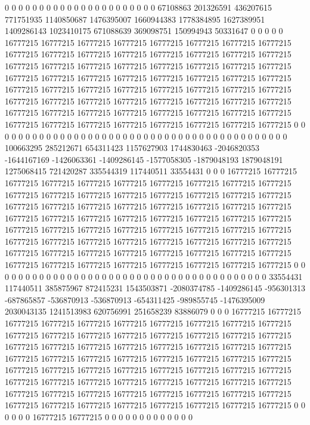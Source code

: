 0 0 0 0 0 0 0 0 0 0 0 0 0 0 0 0 0 0 0 0 0 0 67108863 201326591 436207615 771751935 1140850687 1476395007 1660944383 1778384895 1627389951 1409286143 1023410175 671088639 369098751 150994943 50331647 0 0 0 0 0 16777215 16777215 16777215 16777215 16777215 16777215 16777215 16777215 16777215 16777215 16777215 16777215 16777215 16777215 16777215 16777215 16777215 16777215 16777215 16777215 16777215 16777215 16777215 16777215 16777215 16777215 16777215 16777215 16777215 16777215 16777215 16777215 16777215 16777215 16777215 16777215 16777215 16777215 16777215 16777215 16777215 16777215 16777215 16777215 16777215 16777215 16777215 16777215 16777215 16777215 16777215 16777215 16777215 16777215 16777215 16777215 16777215 16777215 16777215 16777215 16777215 16777215 16777215 16777215 0 0 0 0 0 0 0 0 0 0 0 0 0 0 0 0 0 0 0 0 0 0
0 0 0 0 0 0 0 0 0 0 0 0 0 0 0 0 0 0 0 0 0 100663295 285212671 654311423 1157627903 1744830463 -2046820353 -1644167169 -1426063361 -1409286145 -1577058305 -1879048193 1879048191 1275068415 721420287 335544319 117440511 33554431 0 0 0 16777215 16777215 16777215 16777215 16777215 16777215 16777215 16777215 16777215 16777215 16777215 16777215 16777215 16777215 16777215 16777215 16777215 16777215 16777215 16777215 16777215 16777215 16777215 16777215 16777215 16777215 16777215 16777215 16777215 16777215 16777215 16777215 16777215 16777215 16777215 16777215 16777215 16777215 16777215 16777215 16777215 16777215 16777215 16777215 16777215 16777215 16777215 16777215 16777215 16777215 16777215 16777215 16777215 16777215 16777215 16777215 16777215 16777215 16777215 16777215 16777215 16777215 16777215 16777215 16777215 16777215 0 0 0 0 0 0 0 0 0 0 0 0 0 0 0 0 0 0 0 0 0
0 0 0 0 0 0 0 0 0 0 0 0 0 0 0 0 0 0 0 33554431 117440511 385875967 872415231 1543503871 -2080374785 -1409286145 -956301313 -687865857 -536870913 -536870913 -654311425 -989855745 -1476395009 2030043135 1241513983 620756991 251658239 83886079 0 0 0 16777215 16777215 16777215 16777215 16777215 16777215 16777215 16777215 16777215 16777215 16777215 16777215 16777215 16777215 16777215 16777215 16777215 16777215 16777215 16777215 16777215 16777215 16777215 16777215 16777215 16777215 16777215 16777215 16777215 16777215 16777215 16777215 16777215 16777215 16777215 16777215 16777215 16777215 16777215 16777215 16777215 16777215 16777215 16777215 16777215 16777215 16777215 16777215 16777215 16777215 16777215 16777215 16777215 16777215 16777215 16777215 16777215 16777215 16777215 16777215 16777215 16777215 16777215 16777215 16777215 16777215 0 0 0 0 0 0 16777215 16777215 0 0 0 0 0 0 0 0 0 0 0 0 0
